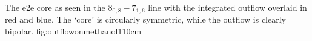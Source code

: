 \documentclass{emulateapj}
\begin{document}
{The e2e core as seen in the \methanol $8_{0,8}-7_{1,6}$ line with
the integrated \twelveco outflow overlaid in red and blue.  The `core'
is circularly symmetric, while the outflow is clearly bipolar.}
{fig:outflowonmethanol}{1}{10cm}








%
%

\end{document}

